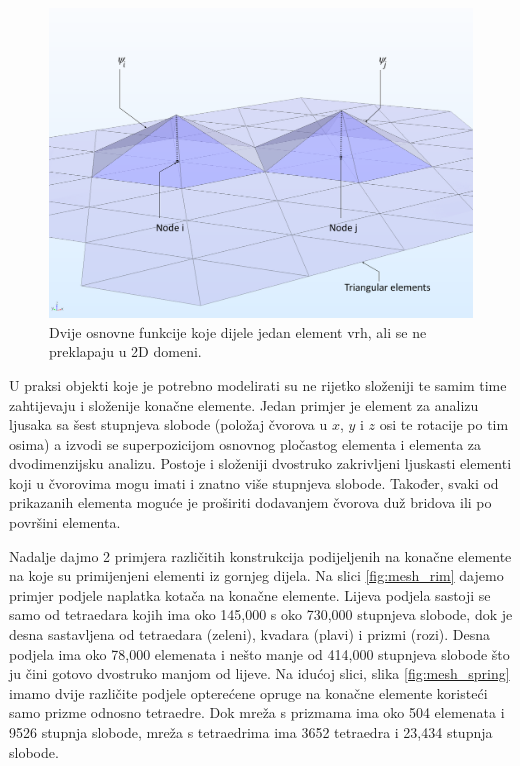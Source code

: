 \documentclass[a4paper,twoside,12pt]{memoir} %
\begin{document}
\begin{figure}[h!t]
\begin{center}
\includegraphics[scale=0.42]{pictures/chapter_fem/base-functions-no-overlap.png}
\caption{Dvije osnovne funkcije koje dijele jedan element vrh, ali se ne preklapaju u 2D domeni. \cite{comsol_fem_general}}
\label{fig:base_triangle_elements}
\end{center}
\end{figure}

\par
U praksi objekti koje je potrebno modelirati su ne rijetko složeniji te samim time zahtijevaju i složenije konačne elemente. Jedan primjer je element za analizu ljusaka sa šest stupnjeva slobode (položaj čvorova u $x$, $y$ i $z$ osi te rotacije po tim osima) a izvodi se superpozicijom osnovnog pločastog elementa i elementa za dvodimenzijsku analizu. Postoje i složeniji dvostruko zakrivljeni ljuskasti elementi koji u čvorovima mogu imati i znatno više stupnjeva slobode. Također, svaki od prikazanih elementa moguće je proširiti dodavanjem čvorova duž bridova ili po površini elementa. \par

Nadalje dajmo 2 primjera različitih konstrukcija podijeljenih na konačne elemente na koje su primijenjeni elementi iz gornjeg dijela. Na slici \ref{fig:mesh_rim} dajemo primjer podjele naplatka kotača na konačne elemente. Lijeva podjela sastoji se samo od tetraedara kojih ima oko 145,000 s oko 730,000 stupnjeva slobode, dok je desna sastavljena od tetraedara (zeleni), kvadara (plavi) i prizmi (rozi). Desna podjela ima oko 78,000 elemenata i nešto manje od 414,000 stupnjeva slobode što ju čini gotovo dvostruko manjom od lijeve. Na idućoj slici, slika \ref{fig:mesh_spring} imamo dvije različite podjele opterećene opruge na konačne elemente koristeći samo prizme odnosno tetraedre. Dok mreža s prizmama ima oko 504 elemenata i 9526 stupnja slobode, mreža s tetraedrima ima 3652 tetraedra i 23,434 stupnja slobode.
\end{document}
